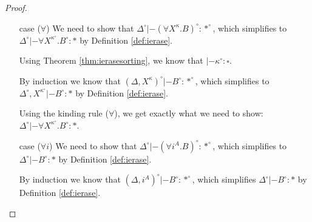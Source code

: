 \begin{proof}
\begin{itemize}
\item[case] ($\forall$)
	We need to show that
	$\Delta^\circ |- (\forall X^\kappa.B)^\circ : *^\circ$,
	which simplifies to
	$\Delta^\circ |- \forall X^{\kappa^\circ}.B^\circ : *$
	by Definition \ref{def:ierase}.

	Using Theorem \ref{thm:ierasesorting}, we know that
	$|- \kappa^\circ : \square$.

	By induction we know that
	$(\Delta,X^\kappa)^\circ |- B^\circ : *^\circ$,
	which simplifies to
	$\Delta^\circ,X^{\kappa^\circ} |- B^\circ : *$
	by Definition \ref{def:ierase}.

	Using the kinding rule ($\forall$), we get exactly
	what we need to show:
	$\Delta^\circ |- \forall X^{\kappa^\circ}.B^\circ : *$.

\item[case] ($\forall i$)
	We need to show that
	$\Delta^\circ |- (\forall i^A.B)^\circ : *^\circ$,
	which simplifies to $\Delta^\circ |- B^\circ : *$
	by Definition \ref{def:ierase}.

	By induction we know that
	$(\Delta,i^A)^\circ |- B^\circ : *^\circ$,
	which simplifies $\Delta^\circ |- B^\circ : *$
	by Definition \ref{def:ierase}.\qedhere
\end{itemize}
\end{proof}


